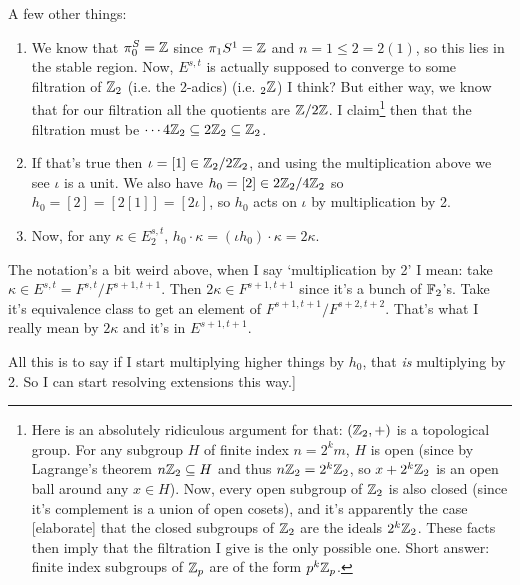 \documentclass{MetricNotes2023}
\def\bb{\ensuremath\mathbb}
\def\subq{\ensuremath\subseteq}
\def\inte{\ensuremath\mathbb{Z}}
\begin{document}
A few other things:
\begin{enumerate}
\item We know that \(\pi_0^S=\inte\) since \(\pi_1S^1=\inte\) and \(n=1\leq 2=2(1)\), so this lies in the stable region. Now, \(E^{s,t}\) is actually supposed to converge to some filtration of \(\inte_2\) (i.e. the 2-adics) (i.e. \(\text{}_2\inte\)) I think? But either way, we know that for our filtration all the quotients are \(\inte/2\inte\). I claim\footnote{Here is an absolutely ridiculous argument for that: \((\inte_2, +)\) is a topological group. For any subgroup \(H\) of finite index \(n=2^km\), \(H\) is open (since by Lagrange's theorem \(n\inte_2\subq H\) and thus \(n\inte_2=2^k\inte_2\), so \(x+2^k\inte_2\) is an open ball around any \(x\in H\)). Now, every open subgroup of \(\inte_2\) is also closed (since it's complement is a union of open cosets), and it's apparently the case [elaborate] that the closed subgroups of \(\inte_2\) are the ideals \(2^k\inte_2\). These facts then imply that the filtration I give is the only possible one. Short answer: finite index subgroups of \(\inte_p\) are of the form \(p^k\inte_p\).} then that the filtration must be \(\cdots 4\inte_2 \subq 2\inte_2 \subq \inte_2\). 
\item If that's true then \(\iota=[1]\in \inte_2/2\inte_2\), and using the multiplication above we see \(\iota\) is a unit. We also have \(h_0=[2]\in 2\inte_2/4\inte_2\) so \(h_0=[2]=[2[1]]=[2\iota]\), so \(h_0\) acts on \(\iota\) by multiplication by 2.
\item Now, for any \(\kappa\in E^{s,t}_2\), \(h_0\cdot \kappa = (\iota h_0)\cdot \kappa=2\kappa\). 
\end{enumerate}
The notation's a bit weird above, when I say `multiplication by 2' I mean: take \(\kappa \in E^{s,t}=F^{s,t}/F^{s+1,t+1}\). Then \(2\kappa \in F^{s+1,t+1}\) since it's a bunch of \(\bb{F}_2\)'s. Take it's equivalence class to get an element of \(F^{s+1, t+1}/F^{s+2,t+2}\). That's what I really mean by \(2\kappa\) and it's in \(E^{s+1,t+1}\).

All this is to say if I start multiplying higher things by \(h_0\), that \textit{is} multiplying by 2. So I can start resolving extensions this way.]

\end{document}

